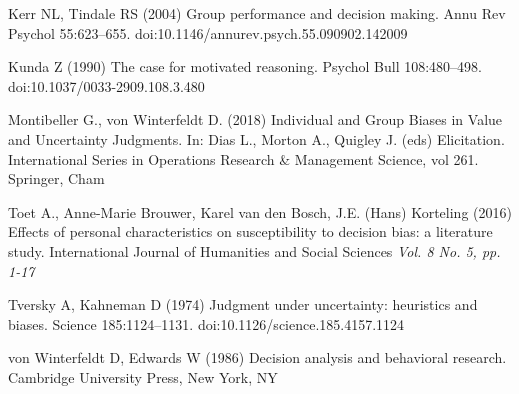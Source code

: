 \documentclass[a4paper,11pt]{article}
\begin{document}

\begin{thebibliography}{}

Kerr NL, Tindale RS (2004) Group performance and decision making. Annu Rev Psychol 55:623–655. doi:10.1146/annurev.psych.55.090902.142009

Kunda Z (1990) The case for motivated reasoning. Psychol Bull 108:480–498. doi:10.1037/0033-2909.108.3.480

Montibeller G., von Winterfeldt D. (2018) Individual and Group Biases in Value and Uncertainty Judgments. In: Dias L., Morton A., Quigley J. (eds) Elicitation. International Series in Operations Research \& Management Science, vol 261. Springer, Cham

Toet A., Anne-Marie Brouwer, Karel van den Bosch, J.E. (Hans) Korteling (2016) Effects of personal characteristics on susceptibility to decision bias: a literature study. International Journal of Humanities and Social Sciences \textit{Vol. 8 No. 5, pp. 1-17}

Tversky A, Kahneman D (1974) Judgment under uncertainty: heuristics and biases. Science
185:1124–1131. doi:10.1126/science.185.4157.1124

von Winterfeldt D, Edwards W (1986) Decision analysis and behavioral research. Cambridge University Press, New York, NY

\end{thebibliography}
\end{document}
